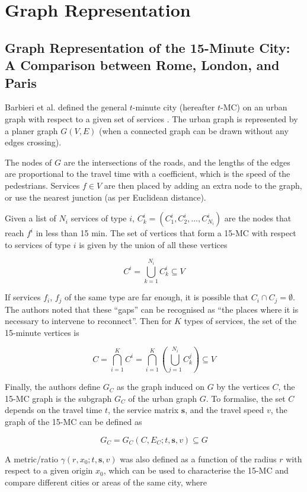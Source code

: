 \section{Graph Representation}

\subsection{Graph Representation of the 15-Minute City: A Comparison between Rome, London, and Paris} \label{barbieri_graph_2023}

Barbieri et al. defined the general $t$-minute city (hereafter $t$-MC) on an urban graph with respect to a given set of services \cite{barbieri_graph_2023}. The urban graph is represented by a planer graph $G(V,E)$ (when a connected graph can be drawn without any edges crossing).

The nodes of $G$ are the intersections of the roads, and the lengths of the edges are proportional to the travel time with a coefficient, which is the speed of the pedestrians. Services $f\in V$ are then placed by adding an extra node to the graph, or use the nearest junction (as per Euclidean distance).

Given a list of $N_i$ services of type $i$, $C^i_k=(C^i_1,C^i_2,...,C^i_{N_i})$ are the nodes that reach $f^i$ in less than 15 min. The set of vertices that form a 15-MC with respect to services of type $i$ is given by the union of all these vertices

$$ C^i=\bigcup_{k=1}^{N_i}C^i_k\subseteq V $$

If services $f_i$, $f_j$ of the same type are far enough, it is possible that $C_i\cap C_j=\emptyset$. The authors noted that these “gaps” can be recognised as “the places where it is necessary to intervene to reconnect”. Then for $K$ types of services, the set of the 15-minute vertices is

$$C=\bigcap^K_{i=1}C^i=\bigcap^K_{i=1}\left(\bigcup^{N_i}_{j=1}C^j_k\right)\subseteq V$$

Finally, the authors define $G_C$ as the graph induced on $G$ by the vertices $C$, the 15-MC graph is the subgraph $G_C$ of the urban graph $G$. To formalise, the set $C$ depends on the travel time $t$, the service matrix $\mathbf s$, and the travel speed $v$, the graph of the 15-MC can be defined as

$$ G_C=G_C(C,E_C;t,\mathbf s,v)\subseteq G $$

A metric/ratio $\gamma(r,x_0;t,\mathbf s,v)$ was also defined as a function of the radius $r$ with respect to a given origin $x_0$, which can be used to characterise the 15-MC and compare different cities or areas of the same city, where

